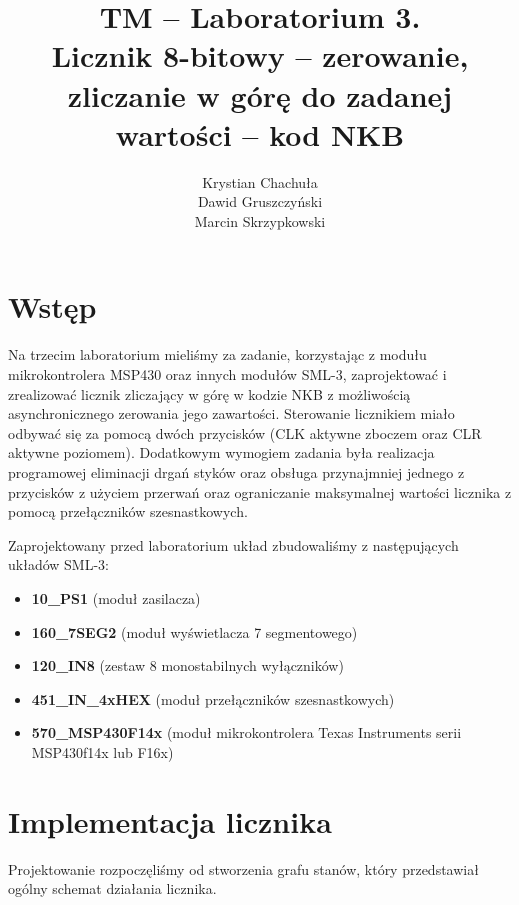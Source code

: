 \documentclass[fleqn]{article}
\title{TM -- Laboratorium 3. \\ \large Licznik 8-bitowy – zerowanie, zliczanie w górę do zadanej wartości – kod NKB}
\author{Krystian Chachuła \\ Dawid Gruszczyński \\ Marcin Skrzypkowski}
\begin{document}
\maketitle

\setcounter{page}{0}
\thispagestyle{empty}

\pagebreak

\setcounter{page}{1}

\section{Wstęp}

Na trzecim laboratorium mieliśmy za zadanie, korzystając z modułu mikrokontrolera MSP430 oraz innych modułów SML-3, zaprojektować i zrealizować licznik zliczający w górę w kodzie NKB z możliwością asynchronicznego zerowania jego zawartości.
Sterowanie licznikiem miało odbywać się za pomocą dwóch przycisków (CLK aktywne zboczem oraz CLR aktywne poziomem).
Dodatkowym wymogiem zadania była realizacja programowej eliminacji drgań styków oraz obsługa przynajmniej jednego z przycisków z użyciem przerwań oraz ograniczanie maksymalnej wartości licznika z pomocą przełączników szesnastkowych.

Zaprojektowany przed laboratorium układ zbudowaliśmy z następujących układów SML-3:

\begin{itemize}
	\item \textbf{10\_PS1} (moduł zasilacza)
	\item \textbf{160\_7SEG2} (moduł wyświetlacza 7 segmentowego)
	\item \textbf{120\_IN8} (zestaw 8 monostabilnych wyłączników)
	\item \textbf{451\_IN\_4xHEX} (moduł przełączników szesnastkowych)
	\item \textbf{570\_MSP430F14x} (moduł mikrokontrolera Texas Instruments serii MSP430f14x lub F16x)
\end{itemize}

\section{Implementacja licznika} 

Projektowanie rozpoczęliśmy od stworzenia grafu stanów, który przedstawiał ogólny schemat działania licznika.
\end{document}
